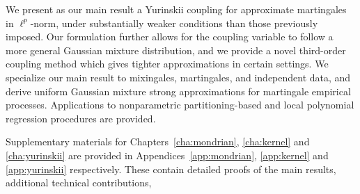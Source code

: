 We present as our main result a Yurinskii coupling for approximate martingales
in $\ell^p$-norm, under substantially weaker conditions than those previously
imposed. Our formulation further allows for the coupling variable to follow a
more general Gaussian mixture distribution, and we provide a novel third-order
coupling method which gives tighter approximations in certain settings. We
specialize our main result to mixingales, martingales, and independent data,
and derive uniform Gaussian mixture strong approximations for martingale
empirical processes. Applications to nonparametric partitioning-based and local
polynomial regression procedures are provided.

Supplementary materials for
Chapters~\ref{cha:mondrian}, \ref{cha:kernel} and \ref{cha:yurinskii}
are provided in Appendices~\ref{app:mondrian}, \ref{app:kernel}
and \ref{app:yurinskii} respectively.
These contain detailed proofs of the main results, additional technical
contributions,

